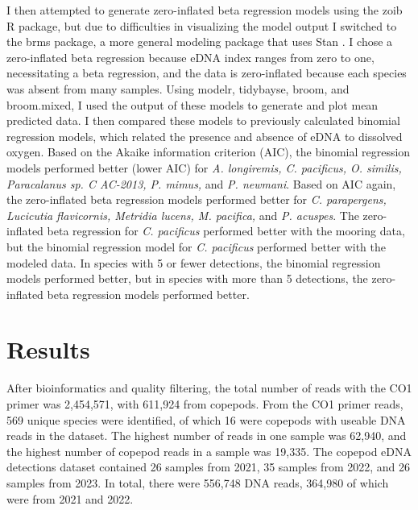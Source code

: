 \documentclass[12pt,twoside]{reedthesis}
\begin{document}
	I then attempted to generate zero-inflated beta regression models using the zoib R package, but due to difficulties in visualizing the model output I switched to the brms package, a more general modeling package that uses Stan \autocite{Burkner2024}. I chose a zero-inflated beta regression because eDNA index ranges from zero to one, necessitating a beta regression, and the data is zero-inflated because each species was absent from many samples. Using modelr, tidybayse, broom, and broom.mixed, I used the output of these models to generate and plot mean predicted data. I then compared these models to previously calculated binomial regression models, which related the presence and absence of eDNA to dissolved oxygen. Based on the Akaike information criterion (AIC), the binomial regression models performed better (lower AIC) for \textit{A. longiremis, C. pacificus, O. similis, Paracalanus sp. C AC-2013, P. mimus,} and \textit{P. newmani}. Based on AIC again, the zero-inflated beta regression models performed better for \textit{C. parapergens, Lucicutia flavicornis, Metridia lucens, M. pacifica,} and \textit{P. acuspes}. The zero-inflated beta regression for \textit{C. pacificus} performed better with the mooring data, but the binomial regression model for \textit{C. pacificus} performed better with the modeled data. In species with 5 or fewer detections, the binomial regression models performed better, but in species with more than 5 detections, the zero-inflated beta regression models performed better.


	\chapter{Results}
	
	
	After bioinformatics and quality filtering, the total number of reads with the CO1 primer was 2,454,571, with 611,924 from copepods. From the CO1 primer reads, 569 unique species were identified, of which 16 were copepods with useable DNA reads in the dataset. The highest number of reads in one sample was 62,940, and the highest number of copepod reads in a sample was 19,335. The copepod eDNA detections dataset contained 26 samples from 2021, 35 samples from 2022, and 26 samples from 2023. In total, there were 556,748 DNA reads, 364,980 of which were from 2021 and 2022. 
	
\end{document}
